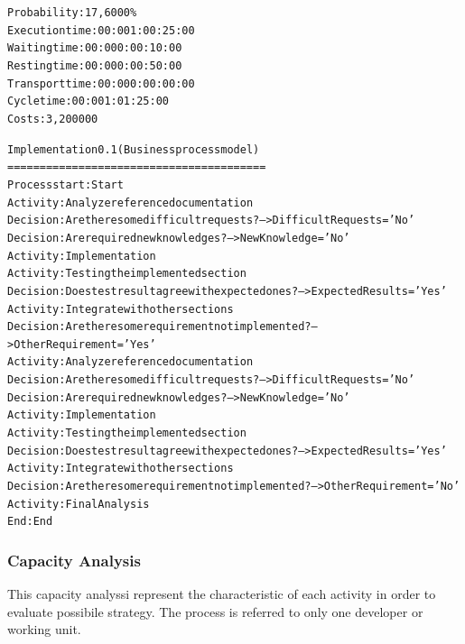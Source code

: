 \begin{alltt}
Probability:   17,6000\%
Execution time:  00:001:00:25:00
Waiting time:  00:000:00:10:00
Resting time:  00:000:00:50:00
Transport time:  00:000:00:00:00
Cycle time:  00:001:01:25:00
Costs:  3,200000

Implementation 0.1 (Business process model)
========================================
Process start: Start
Activity: Analyze reference documentation
Decision: Are there some difficult requests? --> DifficultRequests='No'
Decision: Are required new knowledges? --> NewKnowledge='No'
Activity: Implementation
Activity: Testing the implemented section
Decision: Does test result agree with expected ones? --> ExpectedResults='Yes'
Activity: Integrate with other sections
Decision: Are there some requirement not implemented? --> OtherRequirement='Yes'
Activity: Analyze reference documentation
Decision: Are there some difficult requests? --> DifficultRequests='No'
Decision: Are required new knowledges? --> NewKnowledge='No'
Activity: Implementation
Activity: Testing the implemented section
Decision: Does test result agree with expected ones? --> ExpectedResults='Yes'
Activity: Integrate with other sections
Decision: Are there some requirement not implemented? --> OtherRequirement='No'
Activity: Final Analysis
End: End
\end{alltt}



\subsubsection{Capacity Analysis}
This capacity analyssi represent the characteristic of each activity in order to evaluate possibile strategy. The process is referred to only one developer or working unit.

